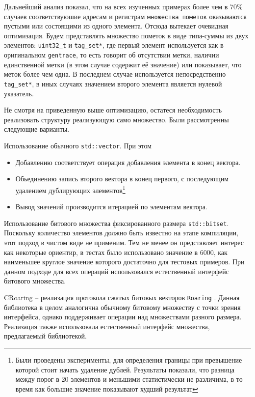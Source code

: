 Дальнейший анализ показал, что на всех изученных примерах более чем в 70\% случаев соответствуюшие адресам и регистрам \texttt{множества пометок} оказываются пустыми или состоящими из одного элемента. Отсюда вытекает очевидная оптимизация. Будем представлять множество пометок в виде типа-суммы из двух элементов: \texttt{uint32\_t} и \texttt{tag\_set*}, где первый элемент используется как в оригинальном \texttt{gentrace}, то есть говорит об отсутствии метки, наличии единственной метки (в этом случае содержит её значение) или показывает, что меток более чем одна. В последнем случае используется непосредственно \texttt{tag\_set*}, в иных случаях значением второго элемента является нулевой указатель.

Не смотря на приведенную выше оптимизацию, остатеся необходимость реализовать структуру реализующую само множество. Были рассмотренны следующие варианты.

\bigskip

Использование обычного \texttt{std::vector}. При этом 
\begin{itemize}
    \item Добавлению соответствует операция добавления элемента в конец вектора.
    \item Обьединению запись второго вектора в конец первого, с последующим удалением дублирующих элементов\footnote{Были проведены эксперименты, для определения границы при превышение которой стоит начать удаление дублей. Результаты показали, что разница между порог в 20 элементов и меньшими статистически не различима, в то время как большие значение показывают худший результат}
    \item Вывод значений производится итерацией по элементам вектора.
\end{itemize}

\bigskip

Использование битового множества фиксированного размера \texttt{std::bitset}. Поскольку количество элементов должно быть известно на этапе компиляции, этот подход в чистом виде не применим. Тем не менее он представляет интерес как некоторые ориентир, в тестах было использовано значение в $6000$, как наименьшее круглое значение которого достаточно для тестовых примеров.
При данном подходе для всех операций использовался естественный интерфейс битового множества.

\bigskip

CRoaring -- реализация протокола сжатых битовых векторов \texttt{Roaring} \cite{Roaring}. Данная библиотека в целом аналогична обычному битовому множеству с точки зрения интерфейса, однако поддерживает операции над множествами разного размера. Реализация также использовала естественный интерфейс множества, предлагаемый библиотекой.


